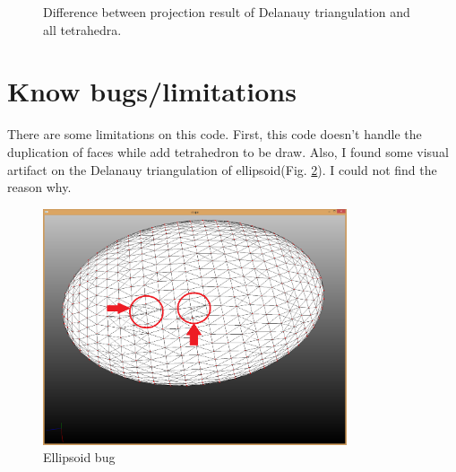 \documentclass[11pt]{article}
\begin{document}
\begin{figure}[hbt]
 \centering
  \hspace{-3mm}
  \hspace{-3mm}
  \caption{Difference between projection result of Delanauy triangulation and all tetrahedra.\label{fig:T}}
\end{figure}
\section{Know bugs/limitations}
There are some limitations on this code. First, this code doesn't handle the duplication of faces while add tetrahedron to be draw. Also, I found some visual artifact on the Delanauy triangulation of ellipsoid(Fig. \ref{fig:Ellipsoid}). I could not find the reason why.
\begin{figure}[htb]
  \begin{center}
  \includegraphics[width=0.8\textwidth]{img/ellipsoid1_bug.png}
  \caption{Ellipsoid bug}
  \label{fig:Ellipsoid}
  \end{center}
\end{figure}



\end{document}
